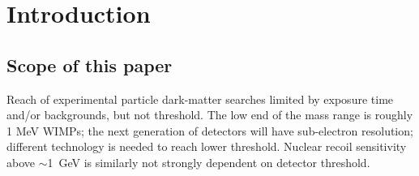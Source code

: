 \section{Introduction}
\label{sec:intro}


\subsection{Scope of this paper}
Reach of experimental particle dark-matter searches limited by exposure time and/or backgrounds, but not threshold. The low end of the mass range is roughly 1 MeV WIMPs; the next generation of detectors will have sub-electron resolution; different technology is needed to reach lower threshold. Nuclear recoil sensitivity above $\sim$1~GeV is similarly not strongly dependent on detector threshold. 

